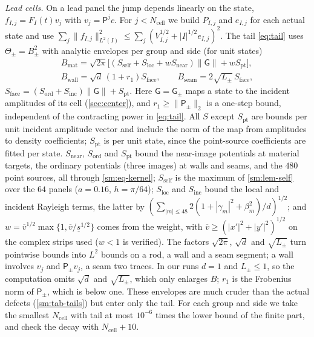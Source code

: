 \emph{Lead cells.} On a lead panel the jump depends linearly on the state,
$f_{I,j}=F_I(t)v_j$ with $v_j=\mathsf P^jc$. For $j<N_{\mathrm{cell}}$ we build
$P_{I,j}$ and $e_{I,j}$ for each actual state and use
$\sum_j\|f_{I,j}\|^2_{L^2(I)}\le\sum_j(V_{I,j}^{1/2}+|I|^{1/2}e_{I,j})^2$. The tail
\eqref{eq:tail} uses $\Theta_\pm=B_\pm^2$ with analytic envelopes per group and side
(for unit states)
\begin{gather*}
  B_{\mathrm{mat}}=\sqrt{2\pi}\bigl[(S_{\mathrm{self}}+S_{\mathrm{loc}}+wS_{\mathrm{near}})
  \|\mathsf G\|+wS_{\mathrm{pt}}\bigr],\\
  B_{\mathrm{wall}}=\sqrt d\,(1+r_1)S_{\mathrm{face}},\qquad
  B_{\mathrm{seam}}=2\sqrt{L_\pm}\,S_{\mathrm{face}},
\end{gather*}
$S_{\mathrm{face}}=(S_{\mathrm{ord}}+S_{\mathrm{inc}})\|\mathsf G\|+S_{\mathrm{pt}}$. Here
$\mathsf G=\mathsf G_\pm$ maps a state to the incident amplitudes of its cell
(\cref{sec:center}), and $r_1\ge\|\mathsf P_\pm\|_2$ is a one-step bound, independent of the
contracting power in \eqref{eq:tail}. All $S$ except $S_{\mathrm{pt}}$ are bounds per
unit incident amplitude vector and include the norm of the map from amplitudes to
density coefficients; $S_{\mathrm{pt}}$ is per unit state, since the point-source
coefficients are fitted per state. $S_{\mathrm{near}}$, $S_{\mathrm{ord}}$
and $S_{\mathrm{pt}}$ bound the near-image potentials at material targets, the
ordinary potentials (three images) at walls and seams, and the $480$ point sources,
all through \eqref{sm:eq-kernel}; $S_{\mathrm{self}}$ is the maximum of
\cref{sm:lem-self} over the $64$ panels ($a=0.16$, $h=\pi/64$); $S_{\mathrm{loc}}$
and $S_{\mathrm{inc}}$ bound the local and incident Rayleigh terms, the latter by
$(\sum_{|m|\le48}2(1+|\gamma_m|^2+\beta_m^2)/d)^{1/2}$; and
$w=\overline v^{1/2}\max\{1,\overline v/\underline s^{1/2}\}$ comes from the weight,
with $\overline v\ge(|x'|^2+|y'|^2)^{1/2}$ on the complex strips used
($w<1$ is verified). The factors $\sqrt{2\pi}$, $\sqrt d$ and $\sqrt{L_\pm}$ turn
pointwise bounds into $L^2$ bounds on a rod, a wall and a seam segment; a wall
involves $v_j$ and $\mathsf P_\pm v_j$, a seam two traces. In our runs $d=1$ and
$L_\pm\le1$, so the computation omits $\sqrt d$ and $\sqrt{L_\pm}$, which only enlarges
$B$; $r_1$ is the Frobenius norm of $\mathsf P_\pm$, which is below one. These envelopes
are much cruder than the actual defects (\cref{sm:tab-tails}) but enter only the
tail. For each group and side we take the smallest $N_{\mathrm{cell}}$ with tail at
most $10^{-6}$ times the lower bound of the finite part, and check the decay with
$N_{\mathrm{cell}}+10$.


